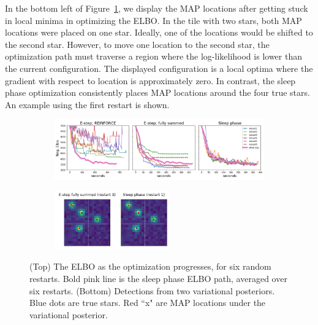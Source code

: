 In the bottom left of Figure~\ref{fig:optim_path}, we display the MAP locations after getting stuck in local minima in optimizing the ELBO. In the tile with two stars, both MAP locations were placed on one star. Ideally, one of the locations would be shifted to the second star. However, to move one location to the second star, the optimization path must traverse a region where the log-likelihood is lower than the current configuration. The displayed configuration is a local optima where the gradient with respect to location is approximately zero. In contrast, the sleep phase optimization consistently places MAP locations around the four true stars. An example using the first restart is shown. 

\begin{figure}[!ht]
    \centering
    \begin{subfigure}[t]{0.9\textwidth}
    \centering
    \includegraphics[width=\textwidth]{figures/optim_path_compare.png}
    \end{subfigure}
    \begin{subfigure}[t]{\textwidth}
    \centering
    \includegraphics[width=0.55\textwidth]{figures/optim_path_detect_compare.png}
    \end{subfigure}
    \vspace{-3em}
    \caption{(Top) The ELBO as the optimization progresses, for six random restarts. Bold pink line is the sleep phase ELBO path, averaged over six restarts. (Bottom) Detections from two variational posteriors. Blue dots are true stars. Red ``x" are MAP locations under the variational posterior. }
    \label{fig:optim_path}
\end{figure}

